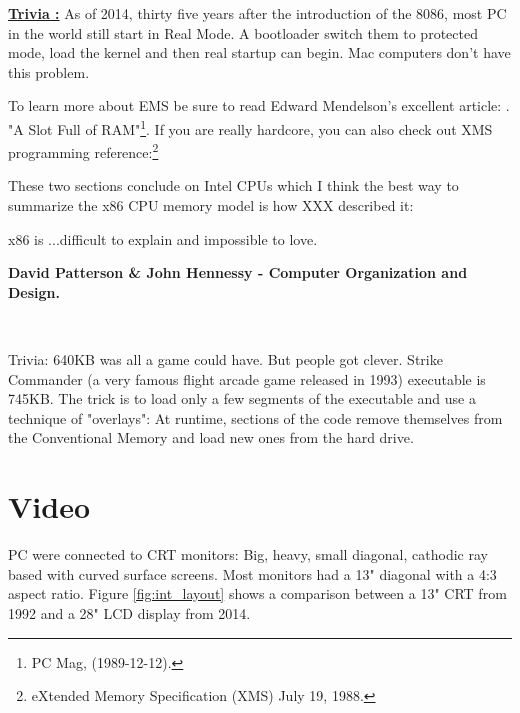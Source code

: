 \documentclass[book.tex]{subfiles}
\begin{document}
\textbf{\underline{Trivia :}}  As of 2014, thirty five years after the introduction of the 8086, most PC in the world still start in Real Mode. A bootloader switch them to protected mode, load the kernel and then real startup can begin. Mac computers don't have this problem.

\bigskip
To learn more about EMS be sure to read Edward Mendelson's excellent article: . "A Slot Full of RAM"\footnote{PC Mag, (1989-12-12).}. If you are really hardcore, you can also check out XMS programming reference:\footnote{eXtended Memory Specification (XMS) July 19, 1988.}\\
\par
These two sections conclude on Intel CPUs which 
I think the best way to summarize the x86 CPU memory model is how XXX described it:\\
\par
 \begin{fancyquotes}
   \lbrack x86 is \rbrack...difficult to explain and impossible to love.\\
   \par
\textbf{David Patterson \& John Hennessy - Computer Organization and Design.}
 \end{fancyquotes}\\
\par
Trivia: 640KB was all a game could have. But people got clever. Strike Commander (a very famous flight arcade game released in 1993) executable is 745KB. The trick is to load only a few segments of the executable and use a technique of "overlays": At runtime, sections of the code remove themselves from the Conventional Memory and load new ones from the hard drive.

















\section{Video}

PC were connected to CRT monitors: Big, heavy, small diagonal, cathodic ray based with curved surface screens. Most monitors had a 13" diagonal with a 4:3 aspect ratio. Figure \ref{fig:int_layout} shows a comparison between a 13" CRT from 1992 and a 28" LCD display from 2014.\\
\end{document}
